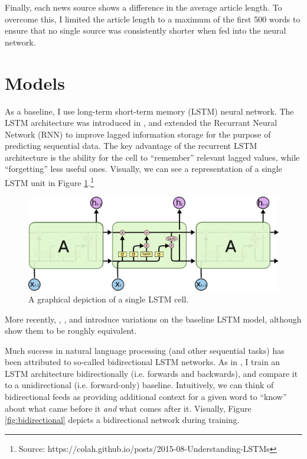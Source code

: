 \documentclass{article}
\begin{document}
	    Finally, each news source shows a difference in the average article length. To overcome this, I limited the article length to a maximum of the first 500 words to ensure that no single source was consistently shorter when fed into the neural network. 
	    	
	\section{Models}
	As a baseline, I use long-term short-term memory (LSTM) neural network. The LSTM architecture was introduced in \citet{hochreiter1997long}, and extended the Recurrant Neural Network (RNN) to improve lagged information storage for the purpose of predicting sequential data. The key advantage of the recurrent LSTM architecture is the ability for the cell to ``remember'' relevant lagged values, while ``forgetting'' less useful ones. Visually, we can see a representation of a single LSTM unit in Figure \ref{fig:lstm}.\footnote{Source: https://colah.github.io/posts/2015-08-Understanding-LSTMs}
	
	\begin{figure}[H]
		\includegraphics[width=\textwidth]{figures/images/lstm-math.png}
		\caption{A graphical depiction of a single LSTM cell.}
		\label{fig:lstm}
	\end{figure}

	More recently, \citet{gers2000recurrent}, \citet{chung2014empirical}, and \citet{yao2015depth} introduce variations on the baseline \citet{hochreiter1997long} LSTM model, although \citet{greff2016lstm} show them to be roughly equivalent. 
	
	Much success in natural language processing (and other sequential tasks) has been attributed to so-called bidirectional LSTM networks. As in \citet{wang2015unified}, I train an LSTM architecture bidirectionally (i.e. forwards and backwards), and compare it to a unidirectional (i.e. forward-only) baseline. Intuitively, we can think of bidirectional feeds as providing additional context for a given word to ``know'' about what came before it \textit{and} what comes after it. Visually, Figure \ref{fig:bidirectional} depicts a bidirectional network during training. 
	 
\end{document}
